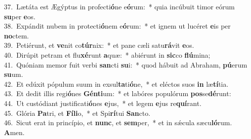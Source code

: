 {37.~}Lætáta est Ægýptus in profecti\textbf{ó}ne e\textbf{ó}rum:~* quia incúbuit timor eórum \textbf{su}per \textbf{e}os.\\
{38.~}Expándit nubem in protecti\textbf{ó}nem e\textbf{ó}rum:~* et ignem ut lucéret \textbf{e}is per \textbf{no}ctem.\\
{39.~}Petiérunt, et \textbf{ve}nit co\textbf{túr}nix:~* et pane cæli satu\textbf{rá}vit \textbf{e}os.\\
{40.~}Dirúpit petram et flu\textbf{xé}runt \textbf{a}quæ:~* abiérunt in \textbf{sic}co \textbf{flú}mina;\\
{41.~}Quóniam memor fuit verbi \textbf{san}cti \textbf{su}i:~* quod hábuit ad Abraham, \textbf{pú}erum \textbf{su}um.\\
{42.~}Et edúxit pópulum suum in exsul\textbf{ta}ti\textbf{ó}ne,~* et eléctos suos \textbf{in} læ\textbf{tí}tia.\\
{43.~}Et dedit illis regi\textbf{ó}nes \textbf{Gén}\textbf{ti}um:~* et labóres populórum \textbf{pos}se\textbf{dé}runt:\\
{44.~}Ut custódiant justificati\textbf{ó}nes \textbf{e}jus,~* et legem \textbf{e}jus re\textbf{quí}rant.\\
{45.~}Glória \textbf{Pa}tri, et \textbf{Fí}\textbf{li}o,~* et Spi\textbf{rí}tui \textbf{San}cto.\\
{46.~}Sicut erat in princípio, et \textbf{nunc}, et \textbf{sem}per,~* et in sǽcula sæcu\textbf{ló}rum. \textbf{A}men.\\
